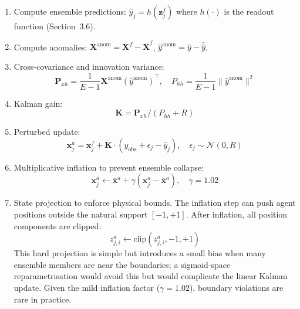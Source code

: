 \documentclass[12pt]{article}
\begin{document}
\begin{enumerate}
    \item Compute ensemble predictions: $\hat{y}_j = h(\mathbf{z}_j^f)$ where $h(\cdot)$ is the readout function (Section~3.6).

    \item Compute anomalies: $\mathbf{X}^{\text{anom}} = \mathbf{X}^f - \bar{\mathbf{X}}^f$, $\hat{y}^{\text{anom}} = \hat{y} - \bar{\hat{y}}$.

    \item Cross-covariance and innovation variance:
    \begin{equation}\label{eq:28}
    \mathbf{P}_{xh} = \frac{1}{E-1} \mathbf{X}^{\text{anom}} (\hat{y}^{\text{anom}})^\top, \quad P_{hh} = \frac{1}{E-1} \|\hat{y}^{\text{anom}}\|^2
    \end{equation}

    \item Kalman gain:
    \begin{equation}\label{eq:29}
    \mathbf{K} = \mathbf{P}_{xh} / (P_{hh} + R)
    \end{equation}

    \item Perturbed update:
    \begin{equation}\label{eq:30}
    \mathbf{x}_j^a = \mathbf{x}_j^f + \mathbf{K} \cdot (y_{\text{obs}} + \epsilon_j - \hat{y}_j), \quad \epsilon_j \sim \mathcal{N}(0, R)
    \end{equation}

    \item Multiplicative inflation to prevent ensemble collapse:
    \begin{equation}\label{eq:31}
    \mathbf{x}_j^a \leftarrow \bar{\mathbf{x}}^a + \gamma (\mathbf{x}_j^a - \bar{\mathbf{x}}^a), \quad \gamma = 1.02
    \end{equation}

    \item State projection to enforce physical bounds. The inflation step can push agent positions outside the natural support $[-1, +1]$. After inflation, all position components are clipped:
    \begin{equation}\label{eq:32}
    z_{j,i}^a \leftarrow \text{clip}(z_{j,i}^a, -1, +1)
    \end{equation}
    This hard projection is simple but introduces a small bias when many ensemble members are near the boundaries; a sigmoid-space reparametrisation would avoid this but would complicate the linear Kalman update. Given the mild inflation factor ($\gamma = 1.02$), boundary violations are rare in practice.
\end{enumerate}
\end{document}
